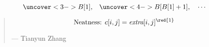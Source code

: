 \begin{frame}{}
  

  \[
    \uncover<3->{B[1],} \quad \uncover<4->{B[B[1] + 1], \quad \cdots}
  \]
\end{frame}

\begin{frame}{}
  \begin{quote}
    \[
      \text{Neatness: } c[i,j] = \text{\it extra}[i,j]^{\red{1}}
    \]

    \hfill --- Tianyun Zhang 
  \end{quote}

  \pause
  \vspace{0.20cm}

  \pause
  \begin{center}
  \end{center}
\end{frame}

% 
% 
% 
